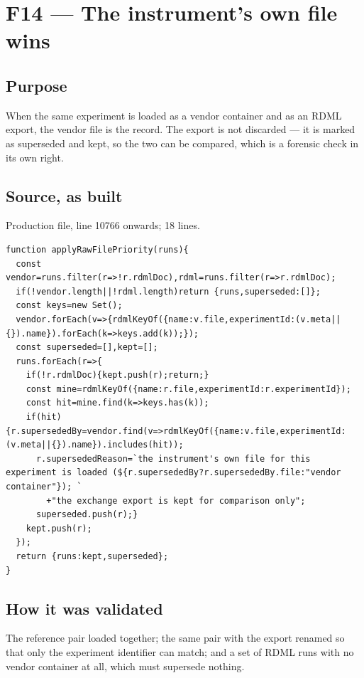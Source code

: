 \section{F14\quad{} --- The instrument's own file wins}
\label{sec:applyRawFilePriority}
\subsection*{Purpose}
When the same experiment is loaded as a vendor container and as an RDML export, the vendor
file is the record. The export is not discarded --- it is marked as superseded and kept, so the two
can be compared, which is a forensic check in its own right.
\subsection*{Source, as built}
Production file, line 10766 onwards; 18 lines.
\begin{lstlisting}[style=js]
function applyRawFilePriority(runs){
  const vendor=runs.filter(r=>!r.rdmlDoc),rdml=runs.filter(r=>r.rdmlDoc);
  if(!vendor.length||!rdml.length)return {runs,superseded:[]};
  const keys=new Set();
  vendor.forEach(v=>{rdmlKeyOf({name:v.file,experimentId:(v.meta||{}).name}).forEach(k=>keys.add(k));});
  const superseded=[],kept=[];
  runs.forEach(r=>{
    if(!r.rdmlDoc){kept.push(r);return;}
    const mine=rdmlKeyOf({name:r.file,experimentId:r.experimentId});
    const hit=mine.find(k=>keys.has(k));
    if(hit){r.supersededBy=vendor.find(v=>rdmlKeyOf({name:v.file,experimentId:(v.meta||{}).name}).includes(hit));
      r.supersededReason=`the instrument's own file for this experiment is loaded (${r.supersededBy?r.supersededBy.file:"vendor container"}); `
        +"the exchange export is kept for comparison only";
      superseded.push(r);}
    kept.push(r);
  });
  return {runs:kept,superseded};
}
\end{lstlisting}

\subsection*{How it was validated}
The reference pair loaded together; the same pair with the export renamed so that only the
experiment identifier can match; and a set of RDML runs with no vendor container at all, which must
supersede nothing.

